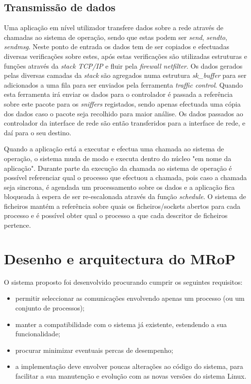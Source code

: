 \subsection{Transmissão de dados}

Uma aplicação em nível utilizador transfere dados sobre a rede através de chamadas ao sistema de operação, sendo que estas podem ser \textit{send}, \textit{sendto}, \textit{sendmsg}.
 Neste ponto de entrada os dados tem de ser copiados e efectuadas diversas verificações sobre estes, após estas verificações são utilizadas estruturas e funções através da \textit{stack TCP/IP} e fluir pela \textit{firewall netfilter}.
 Os dados gerados pelas diversas camadas da \textit{stack} são agregados numa estrutura \textit{sk\_buffer} para ser adicionados a uma fila para ser enviados pela ferramenta \textit{traffic control}.
 Quando esta ferramenta irá enviar os dados para o controlador é passada a referência sobre este pacote para os \textit{sniffers} registados, sendo apenas efectuada uma cópia dos dados caso o pacote seja recolhido para maior análise. Os dados passados ao controlador da interface de rede são então transferidos para a interface de rede, e daí para o seu destino.

Quando a aplicação está a executar e efectua uma chamada ao sistema de operação, o sistema muda de modo e executa dentro do núcleo "em nome da aplicação".
 Durante parte da execução da chamada ao sistema de operação é possível referenciar qual o processo que efectuou a chamada, pois caso a chamada seja sincrona, é agendada um processamento sobre os dados e a aplicação fica bloqueada à espera de ser re-escalonada através da função \textit{schedule}.
 O sistema de ficheiros mantém a referência sobre quais os ficheiros/sockets abertos para cada processo e é possível obter qual o processo a que cada descritor de ficheiros pertence. %

\section{Desenho e arquitectura do MRoP}
\label{sec:mrop_architecture}

O sistema proposto foi desenvolvido procurando cumprir os seguintes requisitos:
\begin{itemize}
\item permitir seleccionar as comunicações envolvendo apenas um processo (ou um conjunto de processos);
\item manter a compatibilidade com o sistema já existente, estendendo a sua funcionalidade;
\item procurar minimizar eventuais percas de desempenho;
\item a implementação deve envolver poucas alterações ao código do sistema, para facilitar a sua manutenção e evolução com as novas versões do sistema Linux.
\end{itemize}

